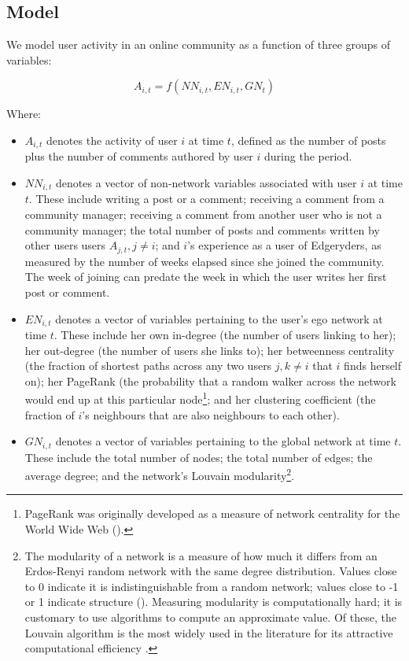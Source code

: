 \subsection{Model}

We model user activity in an online community as a function of three groups of variables:

\begin{equation}
	A_{i,t} = f(NN_{i,t}, EN_{i,t}, GN_t) 
	\label{eq:model}
\end{equation}

Where:
\begin{itemize}
\item $A_{i,t}$ denotes the activity of user $i$ at time $t$, defined as the number of posts plus the number of comments authored by user $i$ during the period.
\item $NN_{i,t}$ denotes a vector of non-network variables associated with user $i$ at time $t$. These include writing a post or a comment; receiving a comment from a community manager; receiving a comment from another user who is not a community manager; the total number of posts and comments written by other users users $A_{j,t}, j \neq i$; and $i$'s experience as a user of Edgeryders, as measured by the number of weeks elapsed since she joined the community. The week of joining can predate the week in which the user writes her first post or comment. 
\item $EN_{i, t}$ denotes a vector of variables pertaining to the user's ego network at time $t$. These include her own in-degree (the number of users linking to her); her out-degree (the number of users she links to); her betweenness centrality (the fraction of shortest paths across any two users $j,k \neq i$ that $i$ finds herself on); her PageRank (the probability that a random walker across the network would end up at this particular node\footnote{PageRank was originally developed as a measure of network centrality for the World Wide Web (\cite{brin2012reprint}).}; and her clustering coefficient (the fraction of $i$'s neighbours that are also neighbours to each other).
\item $GN_{i,t}$ denotes a vector of variables pertaining to the global network at time $t$. These include the total number of nodes; the total number of edges; the average degree; and the network's Louvain modularity\footnote{The modularity of a network is a measure of how much it differs from an Erdos-Renyi random network with the same degree distribution. Values close to 0 indicate it is indistinguishable from a random network; values close to -1 or 1 indicate structure (\cite{clauset2004finding}). Measuring modularity is computationally hard; it is customary to use algorithms to compute an approximate value. Of these, the Louvain algorithm is the most widely used in the literature for its attractive computational efficiency \cite{blondel2008fast}.  }.
\end{itemize}

